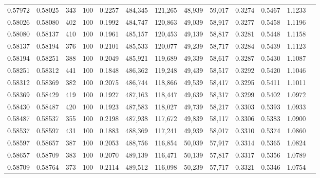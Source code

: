 \begin{tabular}{rrrrrrrrrrrrr}
0.57972 & 0.58025 &   343 & 100 &                                     0.2257 & 484,345 & 121,265 &  48,939 &  59,017 & 0.3274 & 0.5467 & 1.1233 \\
0.58026 & 0.58080 &   402 & 100 &                                     0.1992 & 484,747 & 120,863 &  49,039 &  58,917 & 0.3277 & 0.5458 & 1.1196 \\
0.58080 & 0.58137 &   410 & 100 &                                     0.1961 & 485,157 & 120,453 &  49,139 &  58,817 & 0.3281 & 0.5448 & 1.1158 \\
0.58137 & 0.58194 &   376 & 100 &                                     0.2101 & 485,533 & 120,077 &  49,239 &  58,717 & 0.3284 & 0.5439 & 1.1123 \\
0.58194 & 0.58251 &   388 & 100 &                                     0.2049 & 485,921 & 119,689 &  49,339 &  58,617 & 0.3287 & 0.5430 & 1.1087 \\
0.58251 & 0.58312 &   441 & 100 &                                     0.1848 & 486,362 & 119,248 &  49,439 &  58,517 & 0.3292 & 0.5420 & 1.1046 \\
0.58312 & 0.58369 &   382 & 100 &                                     0.2075 & 486,744 & 118,866 &  49,539 &  58,417 & 0.3295 & 0.5411 & 1.1011 \\
0.58369 & 0.58429 &   419 & 100 &                                     0.1927 & 487,163 & 118,447 &  49,639 &  58,317 & 0.3299 & 0.5402 & 1.0972 \\
0.58430 & 0.58487 &   420 & 100 &                                     0.1923 & 487,583 & 118,027 &  49,739 &  58,217 & 0.3303 & 0.5393 & 1.0933 \\
0.58487 & 0.58537 &   355 & 100 &                                     0.2198 & 487,938 & 117,672 &  49,839 &  58,117 & 0.3306 & 0.5383 & 1.0900 \\
0.58537 & 0.58597 &   431 & 100 &                                     0.1883 & 488,369 & 117,241 &  49,939 &  58,017 & 0.3310 & 0.5374 & 1.0860 \\
0.58597 & 0.58657 &   387 & 100 &                                     0.2053 & 488,756 & 116,854 &  50,039 &  57,917 & 0.3314 & 0.5365 & 1.0824 \\
0.58657 & 0.58709 &   383 & 100 &                                     0.2070 & 489,139 & 116,471 &  50,139 &  57,817 & 0.3317 & 0.5356 & 1.0789 \\
0.58709 & 0.58764 &   373 & 100 &                                     0.2114 & 489,512 & 116,098 &  50,239 &  57,717 & 0.3321 & 0.5346 & 1.0754 \\

\end{tabular}
